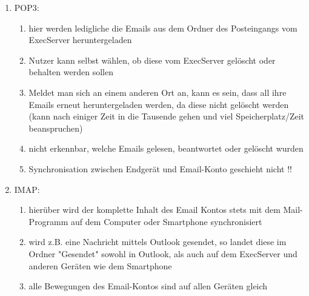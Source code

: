 \documentclass[11pt]{article}
\begin{document}
    \begin{enumerate}
        \item POP3:
        \begin{enumerate}
            \item hier werden ledigliche die Emails aus dem Ordner des Posteingangs
            vom ExecServer heruntergeladen
            \item Nutzer kann selbst wählen, ob diese vom ExecServer gelöscht oder behalten
            werden sollen
            \item Meldet man sich an einem anderen Ort an, kann es sein, dass all ihre Emails
            erneut heruntergeladen werden, da diese nicht gelöscht werden
            (kann nach einiger Zeit in die Tausende gehen und viel Speicherplatz/Zeit beanspruchen)
            \item nicht erkennbar, welche Emails gelesen, beantwortet oder gelöscht wurden
            \item Synchronisation zwischen Endgerät und Email-Konto geschieht nicht !!

        \end{enumerate}

        \item IMAP:
        \begin{enumerate}
            \item hierüber wird der komplette Inhalt des Email Kontos stets mit dem Mail-Programm
            auf dem Computer oder Smartphone synchronisiert
            \item wird z.B. eine Nachricht mittels Outlook gesendet, so landet diese im Ordner "Gesendet"
            sowohl in Outlook, als auch auf dem ExecServer und anderen Geräten wie dem Smartphone
            \item alle Bewegungen des Email-Kontos sind auf allen Geräten gleich

        \end{enumerate}
    \end{enumerate}
\end{document}
